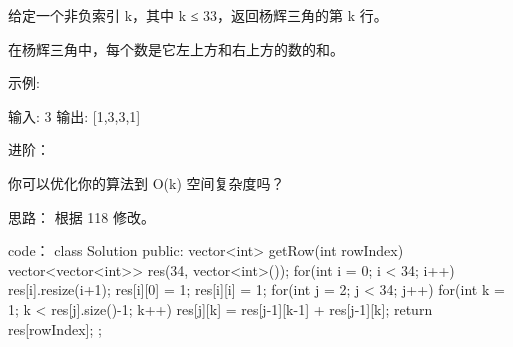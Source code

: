 给定一个非负索引 k，其中 k ≤ 33，返回杨辉三角的第 k 行。

在杨辉三角中，每个数是它左上方和右上方的数的和。

示例:

输入: 3
输出: [1,3,3,1]

进阶：

你可以优化你的算法到 O(k) 空间复杂度吗？




































思路：
根据 118 修改。



































code：
class Solution {
public:
    vector<int> getRow(int rowIndex) {
        vector<vector<int>> res(34, vector<int>());
        for(int i = 0; i < 34; i++)
        {
            res[i].resize(i+1);
            res[i][0] = 1;
            res[i][i] = 1;
        }
        for(int j = 2; j < 34; j++)
        {
            for(int k = 1; k < res[j].size()-1; k++)
            {
                res[j][k] = res[j-1][k-1] + res[j-1][k];
            }
        }
        return res[rowIndex];
    }
};